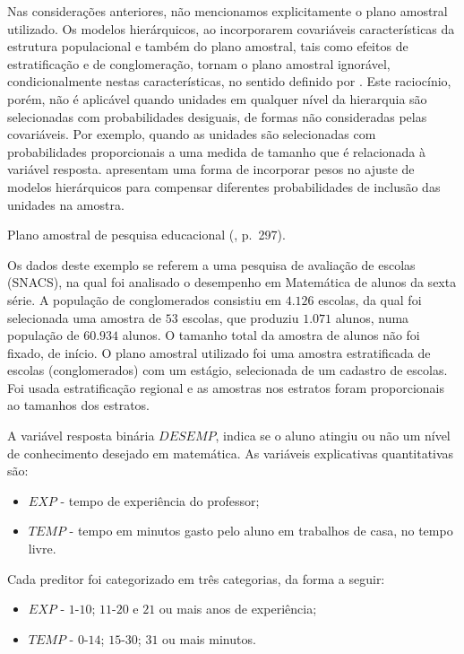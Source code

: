 \documentclass[]{book}
\theoremstyle{definition}
\theoremstyle{definition}
\theoremstyle{definition}
\theoremstyle{remark}
\let\BeginKnitrBlock\begin \let\EndKnitrBlock\end
\begin{document}
Nas considerações anteriores, não mencionamos explicitamente o plano
amostral utilizado. Os modelos hierárquicos, ao incorporarem covariáveis
características da estrutura populacional e também do plano amostral,
tais como efeitos de estratificação e de conglomeração, tornam o plano
amostral ignorável, condicionalmente nestas características, no sentido
definido por \citep{Rubin76}. Este raciocínio, porém, não é aplicável
quando unidades em qualquer nível da hierarquia são selecionadas com
probabilidades desiguais, de formas não consideradas pelas covariáveis.
Por exemplo, quando as unidades são selecionadas com probabilidades
proporcionais a uma medida de tamanho que é relacionada à variável
resposta. \citep{Pfefetalli} apresentam uma forma de incorporar pesos no
ajuste de modelos hierárquicos para compensar diferentes probabilidades
de inclusão das unidades na amostra.

\BeginKnitrBlock{example}
\protect\hypertarget{exm:exe131}{}{\label{exm:exe131} }Plano amostral de
pesquisa educacional (\citep{lethonen}, p.~297).
\EndKnitrBlock{example} Os dados deste exemplo se referem a uma pesquisa
de avaliação de escolas (SNACS), na qual foi analisado o desempenho em
Matemática de alunos da sexta série. A população de conglomerados
consistiu em \(4.126\) escolas, da qual foi selecionada uma amostra de
\(53\) escolas, que produziu \(1.071\) alunos, numa população de
\(60.934\) alunos. O tamanho total da amostra de alunos não foi fixado,
de início. O plano amostral utilizado foi uma amostra estratificada de
escolas (conglomerados) com um estágio, selecionada de um cadastro de
escolas. Foi usada estratificação regional e as amostras nos estratos
foram proporcionais ao tamanhos dos estratos.

A variável resposta binária \(DESEMP\), indica se o aluno atingiu ou não
um nível de conhecimento desejado em matemática. As variáveis
explicativas quantitativas são:

\begin{itemize}
\item
  \(EXP\) - tempo de experiência do professor;
\item
  \(TEMP\) - tempo em minutos gasto pelo aluno em trabalhos de casa, no
  tempo livre.
\end{itemize}

Cada preditor foi categorizado em três categorias, da forma a seguir:

\begin{itemize}
\item
  \(EXP\) - \(1\)-\(10\); \(11\)-\(20\) e \(21\) ou mais anos de
  experiência;
\item
  \(TEMP\) - \(0\)-\(14\); \(15\)-\(30\); \(31\) ou mais minutos.
\end{itemize}
\end{document}

